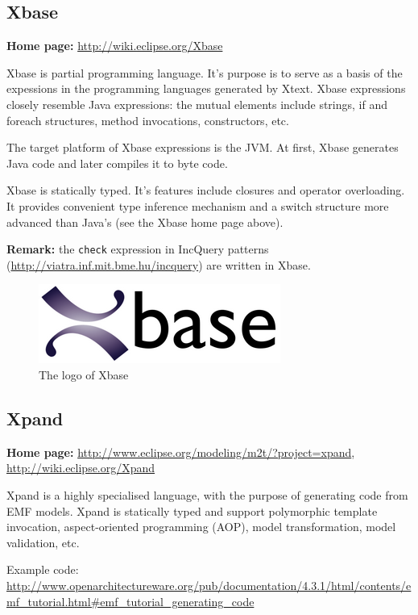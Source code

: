 \documentclass[]{report}
\let\Oldincludegraphics\includegraphics
\renewcommand{\includegraphics}[1]{
\begin{adjustbox}{max size={\textwidth}{\textheight}}
    \Oldincludegraphics[scale=0.6]{#1}%
\end{adjustbox}
}
\begin{document}
\subsection{Xbase}

\textbf{Home page:} \url{http://wiki.eclipse.org/Xbase}

Xbase is partial programming language. It's purpose is to serve as a
basis of the expessions in the programming languages generated by Xtext.
Xbase expressions closely resemble Java expressions: the mutual elements
include strings, if and foreach structures, method invocations,
constructors, etc.

The target platform of Xbase expressions is the JVM. At first, Xbase
generates Java code and later compiles it to byte code.

Xbase is statically typed. It's features include closures and operator
overloading. It provides convenient type inference mechanism and a
switch structure more advanced than Java's (see the Xbase home page
above).

\textbf{Remark:} the \texttt{check} expression in IncQuery patterns
(\url{http://viatra.inf.mit.bme.hu/incquery}) are written in Xbase.

\begin{figure}[htbp]
\centering
\includegraphics{img/code_generation/xbase_logo.png}
\caption{The logo of Xbase}
\end{figure}

\subsection{Xpand}

\textbf{Home page:}
\url{http://www.eclipse.org/modeling/m2t/?project=xpand},
\url{http://wiki.eclipse.org/Xpand}

Xpand is a highly specialised language, with the purpose of generating
code from EMF models. Xpand is statically typed and support polymorphic
template invocation, aspect-oriented programming (AOP), model
transformation, model validation, etc.

Example code:
\url{http://www.openarchitectureware.org/pub/documentation/4.3.1/html/contents/emf_tutorial.html\#emf_tutorial_generating_code}
\end{document}
